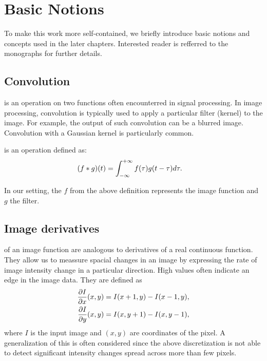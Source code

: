 \chapter{Basic Notions} 
\label{chap:notions}

To make this work more self-contained, we briefly introduce basic notions and concepts used in the later chapters. 
Interested reader is refferred to the monographs \cite{szeliski2010, multipleview} for further details.

\section{Convolution}

 is an operation on two functions often encounterred in signal processing.
In image processing, convolution is typically used to apply a particular filter (kernel) to the image.
For example, the output of such convolution can be a blurred image. 
Convolution with a Gaussian kernel is particularly common. 
\begin{definition}
 is an operation defined as:
\begin{align*}
(f * g)(t)&=\int_{-\infty}^{+\infty} f(\tau)g(t -\tau) d\tau.
\end{align*}
\end{definition} 
In our setting, the $f$ from the above definition represents the image function and $g$ the filter.

\section{Image derivatives}
\label{sec:imder}
 of an image function are analogous to derivatives of a real continuous function.
They allow us to meassure spacial changes in an image by expressing the rate of image intensity change in a particular direction. 
High values often indicate an edge in the image data. 
They are defined as
\begin{align*}
\frac{ \partial I }{ \partial x }(x, y)& = I(x + 1, y) - I(x-1, y), \\
\frac{ \partial I }{ \partial y }(x, y)& = I(x, y + 1) - I(x, y - 1),
\end{align*}
where $I$ is the input image and $(x, y)$ are coordinates of the pixel.
A generalization of this is often considered since the above discretization is not able to detect significant intensity changes spread across more than few pixels. 

